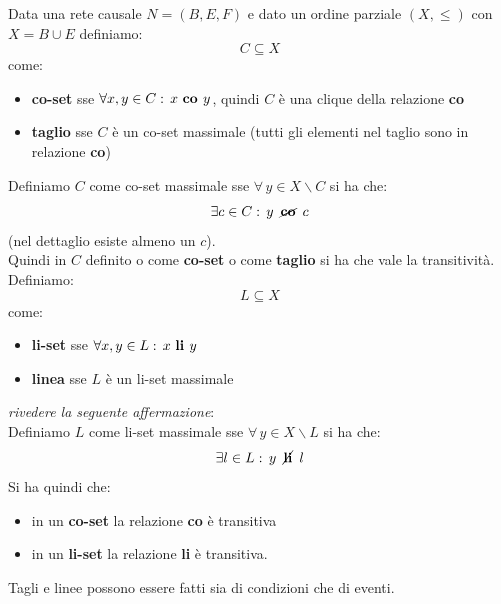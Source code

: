 \documentclass[a4paper,12pt, oneside]{book}
\begin{document}
\begin{definizione}
  Data una rete causale $N=(B,E,F)$ e dato un ordine parziale $(X, \leq)$ con
  $X=B\cup E$ definiamo:
  \[C\subseteq X\]
  come:
  \begin{itemize}
    \item \textbf{co-set} sse $\forall x,y\in C:\, x\mbox{ \textbf{co }}y$,
    quindi $C$ è una clique della relazione \textbf{co}
    \item \textbf{taglio} sse $C$ è un co-set massimale (tutti gli elementi nel
    taglio sono in relazione \textbf{co})
  \end{itemize}
  Definiamo $C$ come co-set massimale sse $\forall\,y\in X\backslash C$ si ha
  che:
  \[\exists c\in C:\,y\,\,\,\cancel{\mathbf{co}}\,\,\,c\]
  (nel dettaglio esiste almeno un $c$). \\
  Quindi in $C$ definito o come \textbf{co-set} o come \textbf{taglio} si ha che
  vale la transitività.\\
  
  Definiamo:
  \[L\subseteq X\]
  come:
  \begin{itemize}
    \item \textbf{li-set} sse $\forall x,y\in L:\, x\mbox{ \textbf{li }}y$
    \item \textbf{linea} sse $L$ è un li-set massimale
  \end{itemize}
  \textit{rivedere la seguente affermazione}:\\
  Definiamo $L$ come li-set massimale sse $\forall\,y\in X\backslash L$ si ha
  che:
  \[\exists l\in L:\,y\,\,\,\cancel{\mathbf{li}}\,\,\,l\]
  Si ha quindi che:
  \begin{itemize}
    \item in un \textbf{co-set} la relazione \textbf{co} è transitiva
    \item in un \textbf{li-set} la relazione \textbf{li} è transitiva.
  \end{itemize}
  Tagli e linee possono essere fatti sia di condizioni che di eventi.
\end{definizione}
\end{document}

